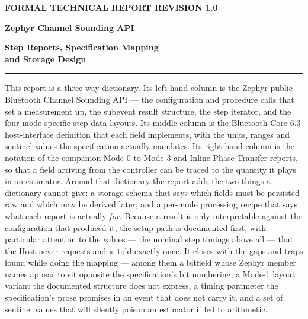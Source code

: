 \documentclass[11pt,a4paper]{article}
\begin{document}
\thispagestyle{empty}
\vspace*{14mm}
{\color{accent}\small\bfseries FORMAL TECHNICAL REPORT \hfill REVISION 1.0}
\vspace{22mm}

{\raggedright\color{navy}\Huge\bfseries Zephyr Channel Sounding API\par}
\vspace{4mm}
{\raggedright\color{navy}\huge\bfseries Step Reports, Specification Mapping\\[2mm] and Storage Design\par}

\vspace{7mm}

\vspace{10mm}
\noindent\rule{\textwidth}{1pt}
\vspace{4mm}

\noindent
This report is a three-way dictionary. Its left-hand column is the Zephyr public Bluetooth Channel
Sounding API --- the configuration and procedure calls that set a measurement up, the subevent result
structure, the step iterator, and the four mode-specific step data layouts. Its middle column is the Bluetooth Core 6.3 host-interface definition that each field
implements, with the units, ranges and sentinel values the specification actually mandates. Its
right-hand column is the notation of the companion Mode-0 to Mode-3 and Inline Phase Transfer
reports, so that a field arriving from the controller can be traced to the quantity it plays in an
estimator. Around that dictionary the report adds the two things a dictionary cannot give: a storage
schema that says which fields must be persisted raw and which may be derived later, and a per-mode
processing recipe that says what each report is actually \emph{for}. Because a result is only
interpretable against the configuration that produced it, the setup path is documented first, with
particular attention to the values --- the nominal step timings above all --- that the Host never
requests and is told exactly once. It closes with the gaps and traps found while doing the mapping
--- among them a bitfield whose Zephyr member names appear to sit opposite the specification's bit
numbering, a Mode-1 layout variant the documented structure does not express, a timing parameter the
specification's prose promises in an event that does not carry it, and a set of sentinel values that
will silently poison an estimator if fed to arithmetic.
\end{document}
